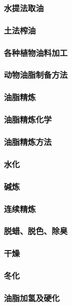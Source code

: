 \documentclass[UTF8]{../../ApplicationUniverse}
\begin{document}
        \subsubsection{水提法取油}
        \subsubsection{土法榨油}
    \subsubsection{各种植物油料加工}
    \subsubsection{动物油脂制备方法}
    \subsubsection{油脂精炼}
        \subsubsection{油脂精炼化学}
        \subsubsection{油脂精炼方法}
            \subsubsection{水化}
            \subsubsection{碱炼}
            \subsubsection{连续精炼}
            \subsubsection{脱蜡、脱色、除臭}
            \subsubsection{干燥}
            \subsubsection{冬化}
    \subsubsection{油脂加氢及硬化}
\end{document}
